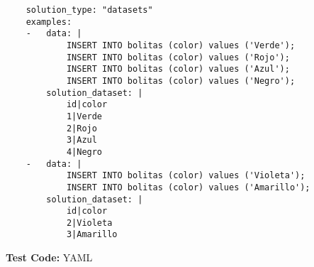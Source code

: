 \begin{listing}[ht]
    \begin{verbatim}
    solution_type: "datasets"
    examples:
    -   data: |
            INSERT INTO bolitas (color) values ('Verde');
            INSERT INTO bolitas (color) values ('Rojo');
            INSERT INTO bolitas (color) values ('Azul');
            INSERT INTO bolitas (color) values ('Negro');
        solution_dataset: |
            id|color
            1|Verde
            2|Rojo
            3|Azul
            4|Negro
    -   data: |
            INSERT INTO bolitas (color) values ('Violeta');
            INSERT INTO bolitas (color) values ('Amarillo');
        solution_dataset: |
            id|color
            2|Violeta
            3|Amarillo
    \end{verbatim}
    \caption{\textbf{Test Code:} YAML}
    \label{listing:yaml}
\end{listing}
